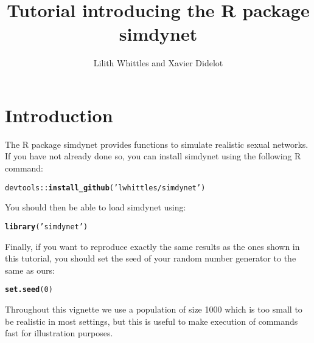 \documentclass[a4paper]{article}\usepackage[]{graphicx}\usepackage[]{color}
\title{Tutorial introducing the R package simdynet}
\author{Lilith Whittles and Xavier Didelot}
\makeatletter
\newcommand{\hlnum}[1]{\textcolor[rgb]{0.686,0.059,0.569}{#1}}%
\newcommand{\hlstr}[1]{\textcolor[rgb]{0.192,0.494,0.8}{#1}}%
\newcommand{\hlopt}[1]{\textcolor[rgb]{0,0,0}{#1}}%
\newcommand{\hlstd}[1]{\textcolor[rgb]{0.345,0.345,0.345}{#1}}%
\newcommand{\hlkwd}[1]{\textcolor[rgb]{0.737,0.353,0.396}{\textbf{#1}}}%
\newenvironment{kframe}{%
 \def\at@end@of@kframe{}%
 \ifinner\ifhmode%
  \def\at@end@of@kframe{\end{minipage}}%
  \begin{minipage}{\columnwidth}%
 \fi\fi%
 \def\FrameCommand##1{\hskip\@totalleftmargin \hskip-\fboxsep
 \colorbox{shadecolor}{##1}\hskip-\fboxsep
     \hskip-\linewidth \hskip-\@totalleftmargin \hskip\columnwidth}%
 \MakeFramed {\advance\hsize-\width
   \@totalleftmargin\z@ \linewidth\hsize
   \@setminipage}}%
 {\par\unskip\endMakeFramed%
 \at@end@of@kframe}
\newenvironment{knitrout}{}{} %
\makeatother
\begin{document}
\maketitle

\section{Introduction}

The R package simdynet provides functions to simulate realistic sexual networks.
If you have not already done so, you can install simdynet using the following R command:

\begin{knitrout}
\color{fgcolor}\begin{kframe}
\begin{alltt}
\hlstd{devtools}\hlopt{::}\hlkwd{install_github}\hlstd{(}\hlstr{'lwhittles/simdynet'}\hlstd{)}
\end{alltt}
\end{kframe}
\end{knitrout}

You should then be able to load simdynet using:
\begin{knitrout}
\color{fgcolor}\begin{kframe}
\begin{alltt}
\hlkwd{library}\hlstd{(}\hlstr{'simdynet'}\hlstd{)}
\end{alltt}


{\ttfamily\noindent\bfseries{}}\end{kframe}
\end{knitrout}

Finally, if you want to reproduce exactly the same results as the ones shown in this tutorial, you should set the seed of your random number generator to the same as ours:
\begin{knitrout}
\color{fgcolor}\begin{kframe}
\begin{alltt}
\hlkwd{set.seed}\hlstd{(}\hlnum{0}\hlstd{)}
\end{alltt}
\end{kframe}
\end{knitrout}

Throughout this vignette we use a population of size 1000 which is too small to be realistic in most settings, but this is useful to make execution of commands fast for illustration purposes.
\end{document}
